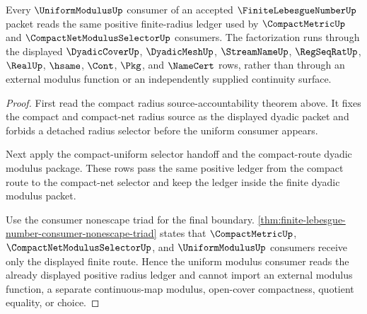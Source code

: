 \begin{theorem}
\label{thm:finite-lebesgue-number-uniform-modulus-source-factorization}
Every $\UniformModulusUp$ consumer of an accepted $\FiniteLebesgueNumberUp$ packet reads the same positive finite-radius ledger used by $\CompactMetricUp$ and $\CompactNetModulusSelectorUp$ consumers. The factorization runs through the displayed $\DyadicCoverUp$, $\DyadicMeshUp$, $\StreamNameUp$, $\RegSeqRatUp$, $\RealUp$, $\hsame$, $\Cont$, $\Pkg$, and $\NameCert$ rows, rather than through an external modulus function or an independently supplied continuity surface.
\end{theorem}
\begin{proof}
First read the compact radius source-accountability theorem above. It fixes the compact and compact-net radius source as the displayed dyadic packet and forbids a detached radius selector before the uniform consumer appears.

Next apply the compact-uniform selector handoff and the compact-route dyadic modulus package. These rows pass the same positive ledger from the compact route to the compact-net selector and keep the ledger inside the finite dyadic modulus packet.

Use the consumer nonescape triad for the final boundary. \autoref{thm:finite-lebesgue-number-consumer-nonescape-triad} states that $\CompactMetricUp$, $\CompactNetModulusSelectorUp$, and $\UniformModulusUp$ consumers receive only the displayed finite route. Hence the uniform modulus consumer reads the already displayed positive radius ledger and cannot import an external modulus function, a separate continuous-map modulus, open-cover compactness, quotient equality, or choice.
\end{proof}

